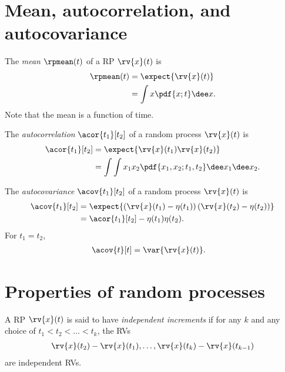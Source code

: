 \section{Mean, autocorrelation, and autocovariance}
\begin{definitionBox}
    The \emph{mean} $\rpmean(t)$ of a RP $\rv{x}(t)$ is 
    \begin{align}
        \rpmean(t) &= \expect{\rv{x}(t)}\\
        &= \int x\pdf{x; t}\dee x.
    \end{align}
    Note that the mean is a function of time.
\end{definitionBox}

\begin{definitionBox}[Autocorrelation]
    The \emph{autocorrelation} $\acor{t_{1}}[t_{2}]$ of a random process $\rv{x}(t)$ is
    \begin{align}
        \acor{t_{1}}[t_{2}] &= \expect{\rv{x}(t_{1})\rv{x}(t_{2})}\\
        &= \int\int x_{1}x_{2}\pdf{x_{1}, x_{2}; t_{1}, t_{2}}\dee x_{1} \dee x_{2}.
    \end{align}
\end{definitionBox}
\begin{definitionBox}[Autocovariance]
    The \emph{autocovariance} $\acov{t_{1}}[t_{2}]$ of a random process $\rv{x}(t)$ is
    \begin{align}
        \acov{t_{1}}[t_{2}] &= \expect{\left(\rv{x}(t_{1}) - \eta(t_{1})\right)\left(\rv{x}(t_{2}) - \eta(t_{2})\right)}\\
        &= \acor{t_{1}}[t_{2}] - \eta(t_{1})\eta(t_{2}).        
    \end{align}
    For $t_{1} = t_{2}$, 
    \begin{align}
        \acov{t}[t] &= \var{\rv{x}(t)}.
    \end{align}
\end{definitionBox}

\section{Properties of random processes}
\begin{definitionBox}
    A RP $\rv{x}(t)$ is said to have \emph{independent increments} if for any $k$ and any choice of $t_{1} < t_{2} < \ldots < t_{k}$, the RVs 
    \begin{align}
        \rv{x}(t_{2}) - \rv{x}(t_{1}), \ldots, \rv{x}(t_{k}) - \rv{x}(t_{k-1})
    \end{align}
    are independent RVs.
\end{definitionBox}


